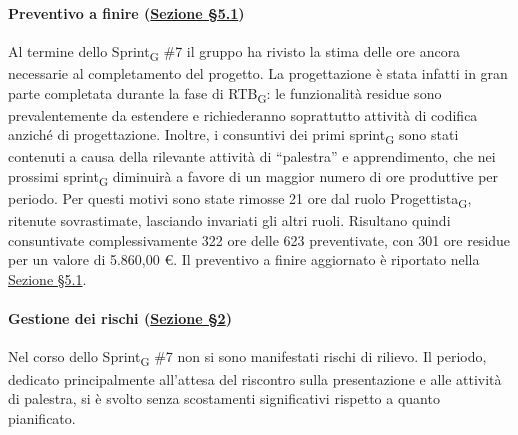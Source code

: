 \documentclass[a4paper, 10pt, colorlinks=true, linkcolor=black, urlcolor=blue, citecolor=blue, hidelinks]{article}
\begin{document}
\paragraph{Preventivo a finire (\hyperref[tab:preventivo-finire]{Sezione \S5.1})}
Al termine dello Sprint\textsubscript{G} \#7 il gruppo ha rivisto la stima delle ore ancora necessarie al completamento del progetto. La progettazione è stata infatti in gran parte completata durante la fase di RTB\textsubscript{G}: le funzionalità residue sono prevalentemente da estendere e richiederanno soprattutto attività di codifica anziché di progettazione. Inoltre, i consuntivi dei primi sprint\textsubscript{G} sono stati contenuti a causa della rilevante attività di ``palestra'' e apprendimento, che nei prossimi sprint\textsubscript{G} diminuirà a favore di un maggior numero di ore produttive per periodo. Per questi motivi sono state rimosse 21 ore dal ruolo Progettista\textsubscript{G}, ritenute sovrastimate, lasciando invariati gli altri ruoli. Risultano quindi consuntivate complessivamente 322 ore delle 623 preventivate, con 301 ore residue per un valore di 5.860,00 €. Il preventivo a finire aggiornato è riportato nella \hyperref[tab:preventivo-finire]{Sezione \S5.1}.

\paragraph{Gestione dei rischi (\hyperref[tab:gestione-rischi]{Sezione \S2})}
Nel corso dello Sprint\textsubscript{G} \#7 non si sono manifestati rischi di rilievo. Il periodo, dedicato principalmente all'attesa del riscontro sulla presentazione e alle attività di palestra, si è svolto senza scostamenti significativi rispetto a quanto pianificato.
\end{document}
